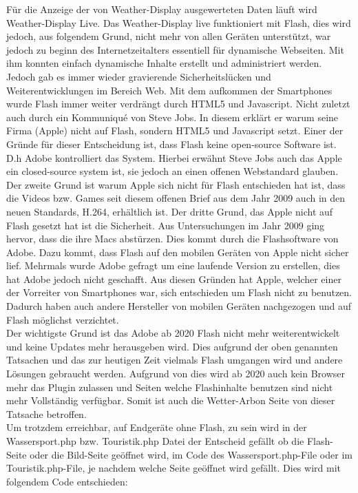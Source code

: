 Für die Anzeige der von Weather-Display ausgewerteten Daten läuft wird Weather-Display Live. Das Weather-Display live funktioniert mit Flash, dies wird jedoch, aus folgendem Grund, nicht mehr von allen Geräten unterstützt, war jedoch zu beginn des Internetzeitalters essentiell für dynamische Webseiten. Mit ihm konnten einfach dynamische Inhalte erstellt und administriert werden. Jedoch gab es immer wieder gravierende Sicherheitslücken und Weiterentwicklungen im Bereich Web. Mit dem aufkommen der Smartphones wurde Flash immer weiter verdrängt durch HTML5 und Javascript. Nicht zuletzt auch durch ein Kommuniqué von Steve Jobs. In diesem erklärt er warum seine Firma (Apple) nicht auf Flash, sondern HTML5 und Javascript setzt. Einer der Gründe für dieser Entscheidung ist, dass Flash keine open-source Software ist. D.h Adobe kontrolliert das System. Hierbei erwähnt Steve Jobs auch das Apple ein closed-source system ist, sie jedoch an einen offenen Webstandard glauben. Der zweite Grund ist warum Apple sich nicht für Flash entschieden hat ist, dass die Videos bzw. Games seit diesem offenen Brief aus dem Jahr 2009 auch in den neuen Standards, H.264, erhältlich ist. Der dritte Grund, das Apple nicht auf Flash gesetzt hat ist die Sicherheit. Aus Untersuchungen im Jahr 2009 ging hervor, dass die ihre Macs abstürzen. Dies kommt durch die Flashsoftware von Adobe. Dazu kommt, dass Flash auf den mobilen Geräten von Apple nicht sicher lief. Mehrmals wurde Adobe gefragt um eine laufende Version zu erstellen, dies hat Adobe jedoch nicht geschafft. Aus diesen Gründen hat Apple, welcher einer der Vorreiter von Smartphones war, sich entschieden um Flash nicht zu benutzen. Dadurch haben auch andere Hersteller von mobilen Geräten nachgezogen und auf Flash möglichst verzichtet. \cite{Apple:ThoughtsOnFlash} \\
Der wichtigste Grund ist das Adobe ab 2020 Flash nicht mehr weiterentwickelt und keine Updates mehr herausgeben wird. Dies aufgrund der oben genannten Tatsachen und das zur heutigen Zeit vielmals Flash umgangen wird und andere Lösungen gebraucht werden. Aufgrund von dies wird ab 2020 auch kein Browser mehr das Plugin zulassen und Seiten welche Flashinhalte benutzen sind nicht mehr Vollständig verfügbar. Somit ist auch die Wetter-Arbon Seite von dieser Tatsache betroffen. \cite{Adobe:FlashTheFutureofInteractiveContent}\\
Um trotzdem erreichbar, auf Endgeräte ohne Flash, zu sein wird in der Wassersport.php bzw. Touristik.php Datei der Entscheid gefällt ob die Flash-Seite oder die Bild-Seite geöffnet wird, im Code des Wassersport.php-File oder im Touristik.php-File, je nachdem welche Seite geöffnet wird gefällt. Dies wird mit folgendem Code entschieden: 

